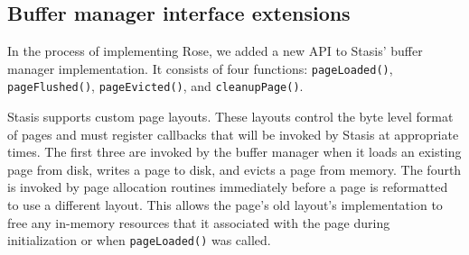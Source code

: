 \documentclass{vldb}
\newcommand{\rows}{Rose\xspace}
\newcommand{\rowss}{Rose's\xspace}
\begin{document}



\subsection{Buffer manager interface extensions}

In the process of implementing \rows, we added a new API to
Stasis' buffer manager implementation.  It consists of four
functions: {\tt pageLoaded()}, {\tt pageFlushed()}, {\tt pageEvicted()},
and {\tt cleanupPage()}.

Stasis supports custom page layouts.  These %
layouts control the byte level format of pages and must register
callbacks that will be invoked by Stasis at appropriate times.  The
first three are invoked by the buffer manager when it loads an
existing page from disk, writes a page to disk, and evicts a page
from memory.  The fourth is invoked by page allocation
routines immediately before a page is reformatted to use a different
layout.  This allows the page's old layout's implementation to
free any in-memory resources that it associated with the page during
initialization or when {\tt pageLoaded()} was called.

\end{document}
